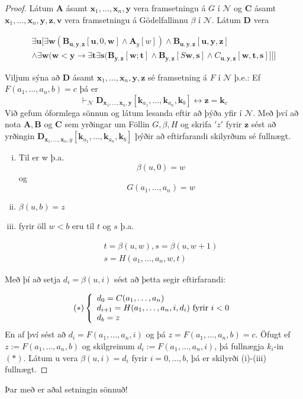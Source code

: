 \documentclass[12pt]{book}
\newcommand{\cN}{\mathcal{N}}
\newcommand{\mb}[1]{\mathbf{#1}}
\newcommand{\bA}{\mathbf{A}}
\newcommand{\bB}{\mathbf{B}}
\newcommand{\bC}{\mathbf{C}}
\newcommand{\bD}{\mathbf{D}}
\newcommand{\bx}{\mathbf{x}}
\newcommand{\bk}{\mathbf{k}}
\newcommand{\by}{\mathbf{y}}
\newcommand{\bz}{\mathbf{z}}
\newcommand{\bv}{\mathbf{v}}
\newcommand{\bxxn}{\bx_1, \dotsc, \bx_n}
\newcommand{\aan}{a_1, \dotsc, a_n}
\newcommand{\bkaan}{\bk_{a_1}, \dotsc,\bk_{a_n}}
\begin{document}
\begin{proof}
  Látum $\bA$ ásamt $\bxxn, \by$ vera framsetningu á $G$ í $\cN$
  og $\bC$ ásamt $\bxxn,\by,\bz,\bv$ vera framsetningu á Gödelfallinnu $\beta$
  í $\cN$. Látum $\bD$ vera

  \begin{gather*}
    \exists \mb{u} [ \exists \mb{w} ( \bB_{\mb{u},\mb{y},\mb{z}} [
    \mb{u}, 0, \mb{w}] \wedge \bA_y [w]) \wedge
    \bB_{\mb{u},\mb{y},\mb{z}}[\mb{u},\mb{y},\mb{z}]\\ \wedge
    \exists \mb{w} (\mb{w} < \by \rightarrow \exists \mb{t} \exists \mb{s} ( \bB_{\mb{y},\mb{z}}[\mb{w};\mb{t}] \wedge \bB_{\mb{y},\mb{z}}[S\mb{w}, \mb{s}] \wedge C_{\mb{u},\mb{y},\mb{z}}[\mb{w}, \mb{t}, \mb{s}]]]]
  \end{gather*}

  Viljum sýna að $\bD$ ásamt $\bxxn, \by, \bz $ sé framsetning á $F$ í $\cN$
  þ.e.: Ef $F(\aan,b) = c$ þá er
  \[\vdash_{\cN} \bD_{\bxxn,\by} [\bkaan, \bk_b] \leftrightarrow \bz = \bk_c\]
  Við gefum óformlega sönnun og látum lesanda eftir að þýða yfir í $\cN$.
  Með því að nota $\bA, \bB$ og $\bC$ sem yrðingar um Föllin
  $G, \beta, H$ og skrifa $'z'$ fyrir $\bz$ sést að 
  yrðingin $\bD_{\bxxn,y}[\bkaan,\bk_b]$ þýðir að eftirfarandi skilyrðum sé fullnægt.
  \begin{enumerate}[(i)]
  \item Til er w þ.a. 
    \[ \beta(u,0) = w \]
    og \[G(\aan) = w\]
  \item $\beta(u,b) = z$

  \item fyrir öll $w < b$ eru til $t$ og $s$ þ.a.

    \begin{gather*}
      t = \beta(u,w), s = \beta(u,w+1)\\
      s = H(\aan,w,t)
    \end{gather*}
  \end{enumerate}

  Með þí að setja $d_i = \beta(u,i)$ sést að þetta segir eftirfarandi:

  \[ (*) \bcondef d_0 = C(\aan) \\ d_{i+1} = H(\aan,i,d_i) \text{ fyrir } i < 0
  \\ d_b = z \econdef \]
  En af því sést að $d_i = F(\aan,i)$ og þá $z = F(\aan,b) = c$.
  Öfugt ef $z := F(\aan,b)$ og skilgreinum $d_i := F(\aan,i)$,
  þá fullnægja $k_i$-in $(*)$. Látum u vera
  $\beta(u,i) = d_i$ fyrir $i = 0, \dotsc,b$, þá er skilyrði (i)-(iii) fullnægt.

\end{proof}
Þar með er aðal setningin sönnuð!
\end{document}
